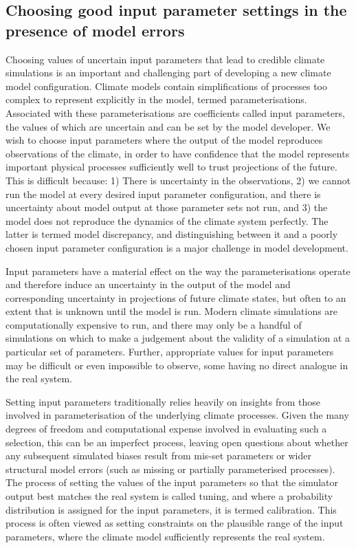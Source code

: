 \documentclass[gmd, manuscript]{copernicus}
\begin{document}


\introduction  %
\subsection{Choosing good input parameter settings in the presence of model errors}

Choosing values of uncertain input parameters that lead to credible climate simulations is an important and challenging part of developing a new climate model configuration. Climate models contain simplifications of processes too complex to represent explicitly in the model, termed parameterisations. Associated with these parameterisations are coefficients called input parameters, the values of which are uncertain and can be set by the model developer. We wish to choose input parameters where the output of the model reproduces observations of the climate, in order to have confidence that the model represents important physical processes sufficiently well to trust projections of the future. This is difficult because: 1) There is uncertainty in the observations, 2) we cannot run the model at every desired input parameter configuration, and there is uncertainty about model output at those parameter sets not run, and 3) the model does not reproduce the dynamics of the climate system perfectly. The latter is termed model discrepancy, and distinguishing between it and a poorly chosen input parameter configuration is a major challenge in model development. 

Input parameters have a material effect on the way the parameterisations operate and therefore induce an uncertainty in the output of the model and corresponding uncertainty in projections of future climate states, but often to an extent that is unknown until the model is run. Modern climate simulations are computationally expensive to run, and there may only be a handful of simulations on which to make a judgement about the validity of a simulation at a particular set of parameters. Further, appropriate values for input parameters may be difficult or even impossible to observe, some having no direct analogue in the real system.

Setting input parameters traditionally relies heavily on insights from those involved in parameterisation of the underlying climate processes. Given the many degrees of freedom and computational expense involved in evaluating such a selection, this can be an imperfect process, leaving open questions about whether any subsequent simulated biases result from mis-set parameters or wider structural model errors (such as missing or partially parameterised processes). The process of setting the values of the input parameters so that the simulator output best matches the real system is called tuning, and where a probability distribution is assigned for the input parameters, it is termed calibration. This process is often viewed as setting constraints on the plausible range of the input parameters, where the climate model sufficiently represents the real system.
\end{document}
